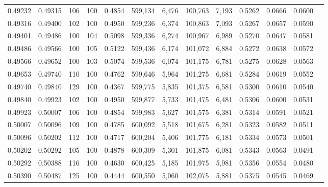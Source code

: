 \begin{tabular}{rrrrrrrrrrrrr}
0.49232 & 0.49315 &   106 & 100 &                                     0.4854 & 599,134 &   6,476 & 100,763 &   7,193 & 0.5262 & 0.0666 & 0.0600 \\
0.49316 & 0.49400 &   102 & 100 &                                     0.4950 & 599,236 &   6,374 & 100,863 &   7,093 & 0.5267 & 0.0657 & 0.0590 \\
0.49401 & 0.49486 &   100 & 104 &                                     0.5098 & 599,336 &   6,274 & 100,967 &   6,989 & 0.5270 & 0.0647 & 0.0581 \\
0.49486 & 0.49566 &   100 & 105 &                                     0.5122 & 599,436 &   6,174 & 101,072 &   6,884 & 0.5272 & 0.0638 & 0.0572 \\
0.49566 & 0.49652 &   100 & 103 &                                     0.5074 & 599,536 &   6,074 & 101,175 &   6,781 & 0.5275 & 0.0628 & 0.0563 \\
0.49653 & 0.49740 &   110 & 100 &                                     0.4762 & 599,646 &   5,964 & 101,275 &   6,681 & 0.5284 & 0.0619 & 0.0552 \\
0.49740 & 0.49840 &   129 & 100 &                                     0.4367 & 599,775 &   5,835 & 101,375 &   6,581 & 0.5300 & 0.0610 & 0.0540 \\
0.49840 & 0.49923 &   102 & 100 &                                     0.4950 & 599,877 &   5,733 & 101,475 &   6,481 & 0.5306 & 0.0600 & 0.0531 \\
0.49923 & 0.50007 &   106 & 100 &                                     0.4854 & 599,983 &   5,627 & 101,575 &   6,381 & 0.5314 & 0.0591 & 0.0521 \\
0.50007 & 0.50096 &   109 & 100 &                                     0.4785 & 600,092 &   5,518 & 101,675 &   6,281 & 0.5323 & 0.0582 & 0.0511 \\
0.50096 & 0.50202 &   112 & 100 &                                     0.4717 & 600,204 &   5,406 & 101,775 &   6,181 & 0.5334 & 0.0573 & 0.0501 \\
0.50202 & 0.50292 &   105 & 100 &                                     0.4878 & 600,309 &   5,301 & 101,875 &   6,081 & 0.5343 & 0.0563 & 0.0491 \\
0.50292 & 0.50388 &   116 & 100 &                                     0.4630 & 600,425 &   5,185 & 101,975 &   5,981 & 0.5356 & 0.0554 & 0.0480 \\
0.50390 & 0.50487 &   125 & 100 &                                     0.4444 & 600,550 &   5,060 & 102,075 &   5,881 & 0.5375 & 0.0545 & 0.0469 \\

\end{tabular}

